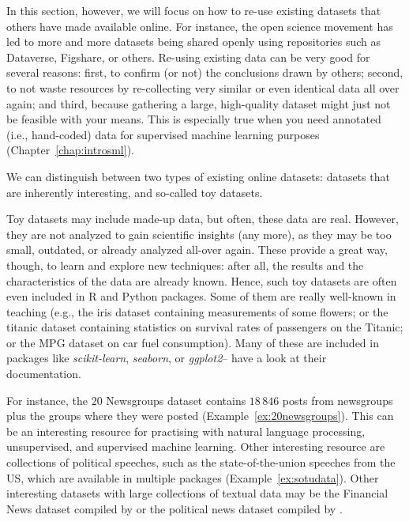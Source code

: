 In this section, however, we will focus on how to re-use existing
datasets that others have made available online. For instance, the
open science movement has led to more and more datasets being shared
openly using repositories such as Dataverse, Figshare, or
others. Re-using existing data can be very good for several reasons:
first, to confirm (or not) the conclusions drawn by others; second, to
not waste resources by re-collecting very similar or even identical
data all over again; and third, because gathering a large,
high-quality dataset might just not be feasible with your means. This
is especially true when you need annotated (i.e., hand-coded) data for
supervised machine learning purposes (Chapter~\ref{chap:introsml}).

We can distinguish between two types of existing online datasets:
datasets that are inherently interesting, and so-called toy datasets.

Toy datasets may include made-up data, but often, these data are
real. However, they are not analyzed to gain scientific insights (any
more), as they may be too small, outdated, or already analyzed
all-over again. These provide a great way, though, to learn and
explore new techniques: after all, the results and the characteristics
of the data are already known. Hence, such toy datasets are often
even included in R and Python packages. Some of them are really
well-known in teaching (e.g., the iris dataset containing measurements
of some flowers; or the titanic dataset containing statistics on
survival rates of passengers on the Titanic; or the MPG dataset on car fuel consumption). Many of these are included
in packages like \emph{scikit-learn}, \emph{seaborn}, or \emph{ggplot2}-- have a look at their documentation.

For instance, the 20 Newsgroups dataset contains $18\,846$ posts from
newsgroups plus the groups where they were posted
(Example~\ref{ex:20newsgroups}). This can be an interesting resource for
practising  with natural language processing, unsupervised, and
supervised machine learning. Other interesting resource are
collections of political speeches, such as the state-of-the-union
speeches from the US, which are available in multiple packages
(Example~\ref{ex:sotudata}).
Other interesting datasets with large collections of textual data may
be the Financial News dataset compiled by \cite{Chen2017} or the
political news dataset compiled by \cite{Horne2018}.



